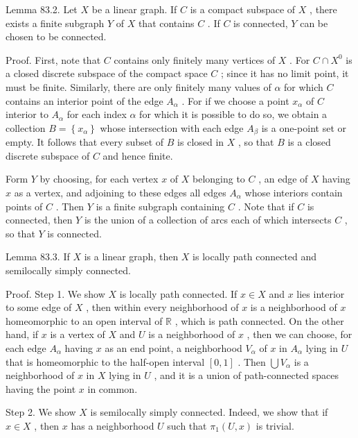 Lemma 83.2. Let \(X\) be a linear graph. If \(C\) is a compact subspace of \(X\) , there exists a finite subgraph \(Y\) of \(X\) that contains \(C\) . If \(C\) is connected, \(Y\) can be chosen to be connected.

Proof. First, note that \(C\) contains only finitely many vertices of \(X\) . For \(C \cap  {X}^{0}\) is a closed discrete subspace of the compact space \(C\) ; since it has no limit point, it must be finite. Similarly, there are only finitely many values of \(\alpha\) for which \(C\) contains an interior point of the edge \({A}_{\alpha }\) . For if we choose a point \({x}_{\alpha }\) of \(C\) interior to \({A}_{\alpha }\) for each index \(\alpha\) for which it is possible to do so, we obtain a collection \(B = \left\{  {x}_{\alpha }\right\}\) whose intersection with each edge \({A}_{\beta }\) is a one-point set or empty. It follows that every subset of \(B\) is closed in \(X\) , so that \(B\) is a closed discrete subspace of \(C\) and hence finite.

Form \(Y\) by choosing, for each vertex \(x\) of \(X\) belonging to \(C\) , an edge of \(X\) having \(x\) as a vertex, and adjoining to these edges all edges \({A}_{\alpha }\) whose interiors contain points of \(C\) . Then \(Y\) is a finite subgraph containing \(C\) . Note that if \(C\) is connected, then \(Y\) is the union of a collection of arcs each of which intersects \(C\) , so that \(Y\) is connected.

Lemma 83.3. If \(X\) is a linear graph, then \(X\) is locally path connected and semilocally simply connected.

Proof. Step 1. We show \(X\) is locally path connected. If \(x \in  X\) and \(x\) lies interior to some edge of \(X\) , then within every neighborhood of \(x\) is a neighborhood of \(x\) homeomorphic to an open interval of \(\mathbb{R}\) , which is path connected. On the other hand, if \(x\) is a vertex of \(X\) and \(U\) is a neighborhood of \(x\) , then we can choose, for each edge \({A}_{\alpha }\) having \(x\) as an end point, a neighborhood \({V}_{\alpha }\) of \(x\) in \({A}_{\alpha }\) lying in \(U\) that is homeomorphic to the half-open interval \(\left\lbrack  {0,1}\right\rbrack\) . Then \(\bigcup {V}_{\alpha }\) is a neighborhood of \(x\) in \(X\) lying in \(U\) , and it is a union of path-connected spaces having the point \(x\) in common.

Step 2. We show \(X\) is semilocally simply connected. Indeed, we show that if \(x \in  X\) , then \(x\) has a neighborhood \(U\) such that \({\pi }_{1}\left( {U,x}\right)\) is trivial.

